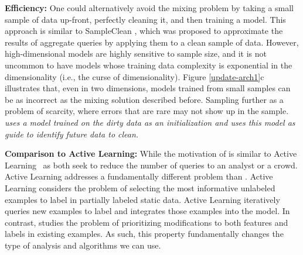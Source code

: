 \vspace{0.5em}
\noindent \textbf{Efficiency: } One could alternatively avoid the mixing problem by taking a small sample of data up-front, perfectly cleaning it, and then training a model.
This approach is similar to SampleClean \cite{wang1999sample}, which was proposed to approximate the results of aggregate queries by applying them to a clean sample of data.
However, high-dimensional models are highly sensitive to sample size, and it is not uncommon to have models whose training data complexity is exponential in the dimensionality (i.e., the curse of dimensionality).
Figure \ref{update-arch1}c illustrates that, even in two dimensions, models trained from small samples can be as incorrect as the mixing solution described before.
Sampling further as a problem of scarcity, where errors that are rare may not show up in the sample.
\emph{\sys uses a model trained on the dirty data as an initialization and uses this model as guide to identify future data to clean.}

\vspace{0.5em}
\noindent \textbf{Comparison to Active Learning: } While the motivation of \sys is similar to Active Learning~\cite{DBLP:journals/pvldb/YakoutENOI11,gokhale2014corleone} as both seek to reduce the number of queries to an analyst or a crowd.
Active Learning addresses a fundamentally different problem than \sys.
Active Learning considers the problem of selecting the most informative unlabeled examples to label in partially labeled static data.
Active Learning iteratively queries new examples to label and integrates those examples into the model.
In contrast, \sys studies the problem of prioritizing modifications to both features and labels in existing examples.
As such, this property fundamentally changes the type of analysis and algorithms we can use.





